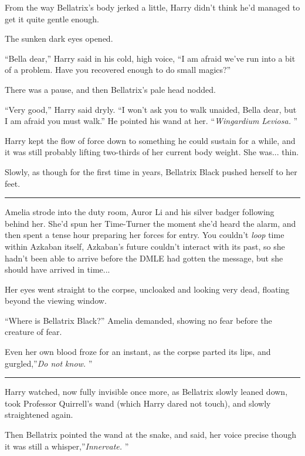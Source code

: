 From the way Bellatrix's body jerked a little, Harry didn't think he'd
managed to get it quite gentle enough.

The sunken dark eyes opened.

``Bella dear,'' Harry said in his cold, high voice, ``I am afraid we've
run into a bit of a problem. Have you recovered enough to do small
magics?''

There was a pause, and then Bellatrix's pale head nodded.

``Very good,'' Harry said dryly. ``I won't ask you to walk unaided,
Bella dear, but I am afraid you must walk.'' He pointed his wand at her.
``\emph{Wingardium Leviosa.} ''

Harry kept the flow of force down to something he could sustain for a
while, and it was still probably lifting two-thirds of her current body
weight. She was... thin.

Slowly, as though for the first time in years, Bellatrix Black pushed
herself to her feet.

\begin{center}\rule{3in}{0.4pt}\end{center}

Amelia strode into the duty room, Auror Li and his silver badger
following behind her. She'd spun her Time-Turner the moment she'd heard
the alarm, and then spent a tense hour preparing her forces for entry.
You couldn't \emph{loop} time within Azkaban itself, Azkaban's future
couldn't interact with its past, so she hadn't been able to arrive
before the DMLE had gotten the message, but she should have arrived in
time...

Her eyes went straight to the corpse, uncloaked and looking very dead,
floating beyond the viewing window.

``Where is Bellatrix Black?'' Amelia demanded, showing no fear before
the creature of fear.

Even her own blood froze for an instant, as the corpse parted its lips,
and gurgled,''\emph{Do not know.} ''

\begin{center}\rule{3in}{0.4pt}\end{center}

Harry watched, now fully invisible once more, as Bellatrix slowly leaned
down, took Professor Quirrell's wand (which Harry dared not touch), and
slowly straightened again.

Then Bellatrix pointed the wand at the snake, and said, her voice
precise though it was still a whisper,''\emph{Innervate.} ''

